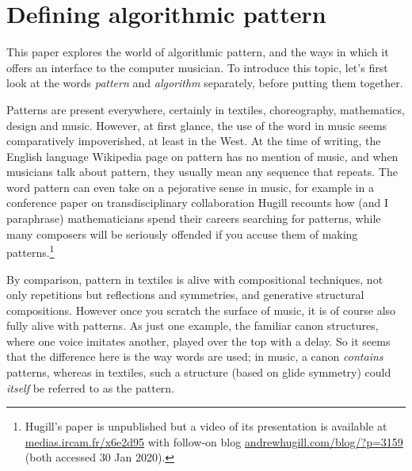 \documentclass{nime-alternate} %
\begin{document}

\printccsdesc

\hypertarget{defining-algorithmic-pattern}{%
\section{Defining algorithmic
pattern}\label{defining-algorithmic-pattern}}

This paper explores the world of algorithmic pattern, and the ways in
which it offers an interface to the computer musician. To introduce this
topic, let's first look at the words \emph{pattern} and \emph{algorithm}
separately, before putting them together.

\sloppypar

Patterns are present everywhere, certainly in textiles, choreography,
mathematics, design and music. However, at first glance, the use of the
word in music seems comparatively impoverished, at least in the West. At
the time of writing, the English language Wikipedia page on pattern has
no mention of music, and when musicians talk about pattern, they usually
mean any sequence that repeats. The word pattern can even take on a
pejorative sense in music, for example in a conference paper on
transdisciplinary collaboration Hugill recounts how (and I paraphrase)
mathematicians spend their careers searching for patterns, while many
composers will be seriously offended if you accuse them of making
patterns.\footnote{Hugill's paper is unpublished but a video of its
  presentation is available at
  \href{https://medias.ircam.fr/x6e2d95}{medias.ircam.fr/x6e2d95} with
  follow-on blog
  \href{http://www.andrewhugill.com/blog/?p=3159}{andrewhugill.com/blog/?p=3159}
  (both accessed 30 Jan 2020).}

By comparison, pattern in textiles is alive with compositional
techniques, not only repetitions but reflections and symmetries, and
generative structural compositions. However once you scratch the surface
of music, it is of course also fully alive with patterns. As just one
example, the familiar canon structures, where one voice imitates
another, played over the top with a delay. So it seems that the
difference here is the way words are used; in music, a canon
\emph{contains} patterns, whereas in textiles, such a structure (based
on glide symmetry) could \emph{itself} be referred to as the pattern.
\end{document}
